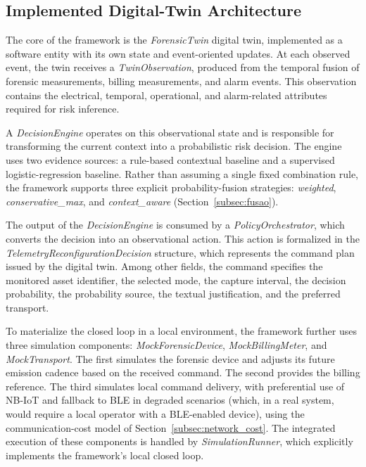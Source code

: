 \documentclass{ieeeaccess}
\begin{document}
\subsection{Implemented Digital-Twin Architecture}
The core of the framework is the \textit{ForensicTwin} digital twin, implemented as a software entity with its own state and event-oriented updates. At each observed event, the twin receives a \textit{TwinObservation}, produced from the temporal fusion of forensic measurements, billing measurements, and alarm events. This observation contains the electrical, temporal, operational, and alarm-related attributes required for risk inference.

A \textit{DecisionEngine} operates on this observational state and is responsible for transforming the current context into a probabilistic risk decision. The engine uses two evidence sources: a rule-based contextual baseline and a supervised logistic-regression baseline. Rather than assuming a single fixed combination rule, the framework supports three explicit probability-fusion strategies: \textit{weighted}, \textit{conservative\_max}, and \textit{context\_aware} (Section~\ref{subsec:fusao}).

The output of the \textit{DecisionEngine} is consumed by a \textit{PolicyOrchestrator}, which converts the decision into an observational action. This action is formalized in the \textit{TelemetryReconfigurationDecision} structure, which represents the command plan issued by the digital twin. Among other fields, the command specifies the monitored asset identifier, the selected mode, the capture interval, the decision probability, the probability source, the textual justification, and the preferred transport.

To materialize the closed loop in a local environment, the framework further uses three simulation components: \textit{MockForensicDevice}, \textit{MockBillingMeter}, and \textit{MockTransport}. The first simulates the forensic device and adjusts its future emission cadence based on the received command. The second provides the billing reference. The third simulates local command delivery, with preferential use of NB-IoT and fallback to BLE in degraded scenarios (which, in a real system, would require a local operator with a BLE-enabled device), using the communication-cost model of Section~\ref{subsec:network_cost}. The integrated execution of these components is handled by \textit{SimulationRunner}, which explicitly implements the framework's local closed loop.
\end{document}
